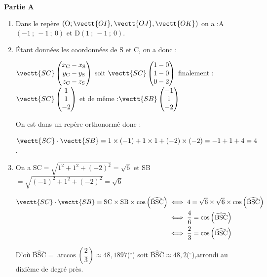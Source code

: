\textbf{Partie A}

\begin{enumerate}
\item 

Dans le repère $\left(\mathrm{O}; \vectt{OI}, \vectt{OJ}, \vectt{OK}\right)$ on a :\quad A$(-1~;~-1~;~0)$ \quad et \quad D$(1~;~-1~;~0)$.

\item Étant données les coordonnées de S et C, on a donc :

$\vectt{SC}\begin{pmatrix}	x_\mathrm{C}-x_\mathrm{S} \\ y_\mathrm{C}-y_\mathrm{S}\\ z_\mathrm{C}-z_\mathrm{S} \end{pmatrix}$ \quad soit \quad $\vectt{SC}\begin{pmatrix}	1-0 \\ 1-0\\ 0-2 \end{pmatrix}$ \quad finalement :\quad $\vectt{SC}\begin{pmatrix}	1 \\1\\-2 \end{pmatrix}$
\quad et de même :\quad $\vectt{SB}\begin{pmatrix}	-1 \\1\\-2 \end{pmatrix}$

On est dans un repère orthonormé donc :

$\vectt{SC}\cdot\vectt{SB}= 1 \times (-1) + 1 \times 1 + (-2) \times (-2) = -1 +1+4=4$.

\item On a SC$=\sqrt{ 1^2+1^2+(-2)^2} = \sqrt{6}$ \quad et \quad SB$=\sqrt{ (-1)^2+1^2+(-2)^2} = \sqrt{6}$

$	\begin{aligned} \vectt{SC}\cdot\vectt{SB} = \mathrm{SC} \times \mathrm{SB} \times \cos\left(\widehat{\mathrm{BSC}}\right) & \iff 4 = \sqrt{6} \times \sqrt{6} \times \cos\left(\widehat{\mathrm{BSC}}\right) \\
			& \iff \dfrac{4}{6} = \cos\left(\widehat{\mathrm{BSC}}\right) \\
				& \iff \dfrac{2}{3} = \cos\left(\widehat{\mathrm{BSC}}\right) \\
			\end{aligned} $

	D'où \quad $\widehat{\mathrm{BSC}} = \arccos\left(\dfrac{2}{3}\right) \approx 48,1897$(\ensuremath{^\circ}) \quad soit \quad $\widehat{\mathrm{BSC}} \approx 48,2 $(\ensuremath{^\circ}),\quad arrondi au dixième de degré près.
	\end{enumerate}


